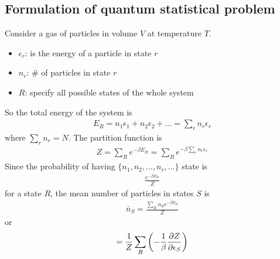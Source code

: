 \documentclass[../main.tex]{subfiles}
\begin{document}
\subsection{Formulation of quantum statistical problem}
Consider a gas of particles in volume $V$ at temperature $T$.
\begin{itemize}
    \item $\epsilon_r$: is the energy of a particle in state $r$
    \item $n_r$: \# of particles in state $r$
    \item $R$: specify all possible states of the whole system
\end{itemize}
So the total energy of the system is
\begin{align*}
    E_R = n_1 \epsilon_1 + n_2 \epsilon_2 + \dots = \sum_r n_r \epsilon_r
\end{align*}
where $\sum_r n_r = N$. The partition function is
\begin{align*}
    Z = \sum_R e^{-\beta E_R} = \sum_R e^{-\beta \sum_r n_r \epsilon_r}
\end{align*}
Since the probability of having $\{n_1, n_2, \dots, n_r, \dots\}$ state is
\begin{align*}
    \frac{e^{-\beta E_R}}{Z}
\end{align*}
for a state $R$, the mean number of particles in states $S$ is
\begin{align*}
    \bar n_S = \frac{\sum_R n_S e^{-\beta E_R}}{Z}
\end{align*}
or
\begin{align*}
    = \frac{1}{Z} \sum_R \qt(-\frac{1}{\beta} \pdv{Z}{\epsilon_S})
\end{align*}
\end{document}
